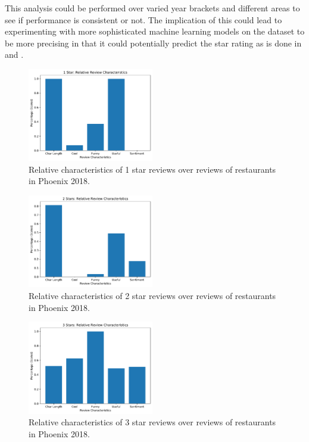This analysis could be performed over varied year brackets and different areas to see if performance is consistent or not. The implication of this could lead to experimenting with more sophisticated machine learning models on the dataset to be more precising in that it could potentially predict the star rating as is done in \cite{reddy2017prediction} and \cite{monett2016predicting}.

\begin{figure}[h]
    \centering
    \includegraphics[width=0.49\textwidth]{img/phoenix2018/1Star.pdf}
    \caption{Relative characteristics of 1 star reviews over reviews of restaurants in Phoenix 2018.}
    \label{fig:1star}
\end{figure}

\begin{figure}[h]
    \centering
    \includegraphics[width=0.49\textwidth]{img/phoenix2018/2Stars.pdf}
    \caption{Relative characteristics of 2 star reviews over reviews of restaurants in Phoenix 2018.}
    \label{fig:2star}
\end{figure}

\begin{figure}[h]
    \centering
    \includegraphics[width=0.49\textwidth]{img/phoenix2018/3Stars.pdf}
    \caption{Relative characteristics of 3 star reviews over reviews of restaurants in Phoenix 2018.}
    \label{fig:3star}
\end{figure}

